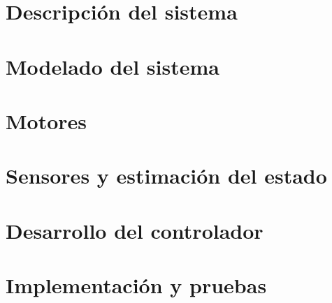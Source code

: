 \documentclass[spanish,12pt,a4paper,titlepage,twoside,openright]{scrbook}
\begin{document}
\rmfamily
\renewcommand{\appendixtocname}{Anexos}


\tableofcontents

\part{Descripción del sistema}


\part{Modelado del sistema}


\part{Motores}


\part{Sensores y estimaci\'on del estado}
\label{part:sensores-y-estimacion-del-estado}






\part{Desarrollo del controlador}



\part{Implementaci\'on y pruebas}




\cleardoublepage
\addappheadtotoc
\renewcommand{\appendixpagename}{Anexos}
\appendixpage
\renewcommand{\appendixname}{Anexo}


\appendix 











 
\cleardoublepage
{}
{}

\end{document}
